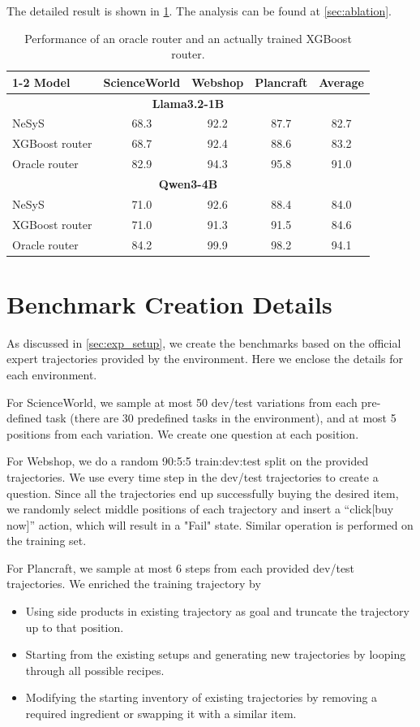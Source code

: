 \documentclass{article}
\theoremstyle{plain}
\theoremstyle{definition}
\theoremstyle{remark}
\newcommand{\ours}{{\sc NeSyS}\xspace}
\begin{document}
The detailed result is shown in \cref{tab:router}. The analysis can be found at \cref{sec:ablation}.
\begin{table}[ht]
  \caption{Performance of an oracle router and an actually trained XGBoost router.}
  \label{tab:router}
  \centering
  \begin{tabular}{lcccc}
    \toprule
    \cmidrule(r){1-2}
    Model & ScienceWorld & Webshop & Plancraft & Average\\
    \midrule
    \multicolumn{5}{c}{\bf Llama3.2-1B} \\
    \midrule
    \ours & 68.3& 92.2& 87.7 & 82.7 \\
    XGBoost router & 68.7 & 92.4 &88.6 & 83.2\\    
    Oracle router & 82.9 & 94.3 & 95.8 & 91.0 \\
    \midrule
    \multicolumn{5}{c}{\bf Qwen3-4B} \\
    \midrule
    \ours & 71.0& 92.6& 88.4& 84.0 \\
    XGBoost router & 71.0 & 91.3&91.5 & 84.6\\   
    Oracle router & 84.2 & 99.9 & 98.2 & 94.1 \\
    \bottomrule
  \end{tabular}
\end{table}
\section{Benchmark Creation Details}\label{app:data-collection}
As discussed in \cref{sec:exp_setup}, we create the benchmarks based on the official expert trajectories provided by the environment. Here we enclose the details for each environment.

For ScienceWorld, we sample at most 50 dev/test variations from each pre-defined task (there are 30 predefined tasks in the environment), and at most 5 positions from each variation. We create one question at each position. 

For Webshop, we do a random 90:5:5 train:dev:test split on the provided trajectories. We use every time step in the dev/test trajectories to create a question. Since all the trajectories end up successfully buying the desired item, we randomly select middle positions of each trajectory and insert a ``click[buy now]'' action, which will result in a "Fail" state. Similar operation is performed on the training set.

For Plancraft, we sample at most 6 steps from each provided dev/test trajectories. We enriched the training trajectory by 
\begin{itemize}
    \item Using side products in existing trajectory as goal and truncate the trajectory up to that position.
    \item Starting from the existing setups and generating new trajectories by looping through all possible recipes.
    \item Modifying the starting inventory of existing trajectories by removing a required ingredient or swapping it with a similar item.
\end{itemize}
\end{document}

